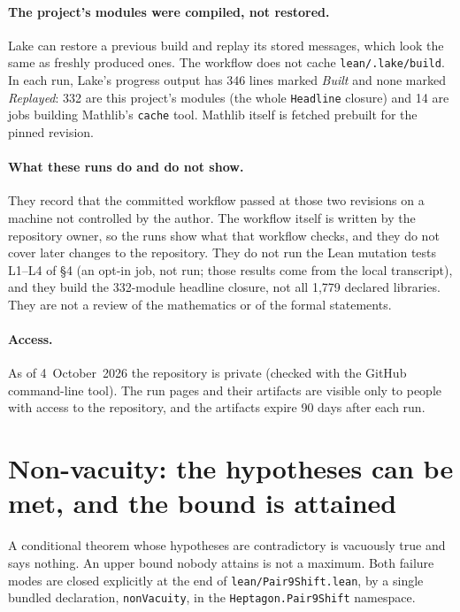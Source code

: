 \documentclass[11pt]{article}
\newcommand{\code}[1]{\texttt{\small #1}}
\begin{document}
\paragraph{The project's modules were compiled, not restored.} Lake can
restore a previous build and replay its stored messages, which look the same
as freshly produced ones. The workflow does not cache \code{lean/.lake/build}.
In each run, Lake's progress output has 346 lines marked \emph{Built} and none
marked \emph{Replayed}: 332 are this project's modules (the whole
\code{Headline} closure) and 14 are jobs building Mathlib's \code{cache}
tool. Mathlib itself is fetched prebuilt for the pinned revision.

\paragraph{What these runs do and do not show.} They record that the committed
workflow passed at those two revisions on a machine not controlled by the
author. The workflow itself is written by the repository owner, so the runs
show what that workflow checks, and they do not cover later changes to the
repository. They do not run the Lean mutation tests L1--L4 of \S4 (an opt-in
job, not run; those results come from the local transcript), and they build
the 332-module headline closure, not all 1{,}779 declared libraries. They are
not a review of the mathematics or of the formal statements.

\paragraph{Access.} As of 4~October~2026 the repository is private (checked
with the GitHub command-line tool). The run pages and their artifacts are
visible only to people with access to the repository, and the artifacts expire
90 days after each run.

\section{Non-vacuity: the hypotheses can be met, and the bound is attained}\label{sec:nonvac}

{\sloppy
A conditional theorem whose hypotheses are contradictory is vacuously true and
says nothing. An upper bound nobody attains is not a maximum. Both failure modes
are closed explicitly at the end of \code{lean/Pair9Shift.lean}, by a single
bundled declaration, \code{nonVacuity}, in the \code{Heptagon.Pair9Shift}
namespace.\par}
\end{document}
